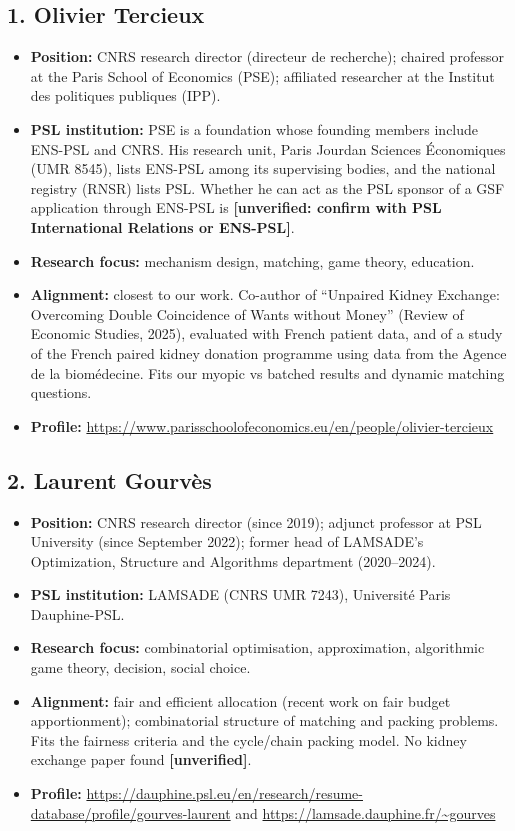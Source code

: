 \documentclass[10pt]{article}
\begin{document}
\subsection*{1. Olivier Tercieux}
\begin{itemize}
  \item \textbf{Position:} CNRS research director (directeur de recherche); chaired
        professor at the Paris School of Economics (PSE); affiliated researcher at the
        Institut des politiques publiques (IPP).
  \item \textbf{PSL institution:} PSE is a foundation whose founding members include
        ENS-PSL and CNRS. His research unit, Paris Jourdan Sciences \'Economiques
        (UMR 8545), lists ENS-PSL among its supervising bodies, and the national registry
        (RNSR) lists PSL. Whether he can act as the PSL sponsor of a GSF application
        through ENS-PSL is \textbf{[unverified: confirm with PSL International Relations or
        ENS-PSL]}.
  \item \textbf{Research focus:} mechanism design, matching, game theory, education.
  \item \textbf{Alignment:} closest to our work. Co-author of ``Unpaired Kidney Exchange:
        Overcoming Double Coincidence of Wants without Money'' (Review of Economic
        Studies, 2025), evaluated with French patient data, and of a study of the French
        paired kidney donation programme using data from the Agence de la biom\'edecine.
        Fits our myopic vs batched results and dynamic matching questions.
  \item \textbf{Profile:} \url{https://www.parisschoolofeconomics.eu/en/people/olivier-tercieux}
\end{itemize}

\subsection*{2. Laurent Gourv\`es}
\begin{itemize}
  \item \textbf{Position:} CNRS research director (since 2019); adjunct professor at PSL
        University (since September 2022); former head of LAMSADE's Optimization,
        Structure and Algorithms department (2020--2024).
  \item \textbf{PSL institution:} LAMSADE (CNRS UMR 7243), Universit\'e Paris Dauphine-PSL.
  \item \textbf{Research focus:} combinatorial optimisation, approximation, algorithmic
        game theory, decision, social choice.
  \item \textbf{Alignment:} fair and efficient allocation (recent work on fair budget
        apportionment); combinatorial structure of matching and packing problems. Fits
        the fairness criteria and the cycle/chain packing model. No kidney exchange paper
        found \textbf{[unverified]}.
  \item \textbf{Profile:} \url{https://dauphine.psl.eu/en/research/resume-database/profile/gourves-laurent}
        and \url{https://lamsade.dauphine.fr/~gourves}
\end{itemize}
\end{document}
